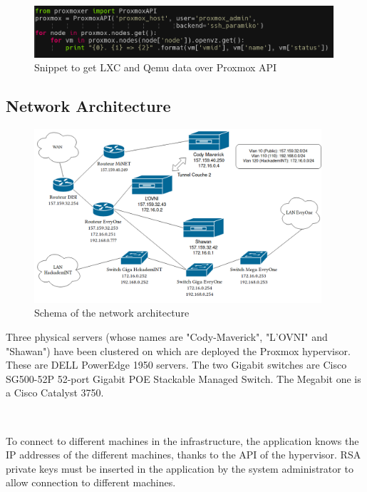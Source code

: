 \begin{figure}[!h]
  \centering
  \includegraphics[width=0.99\textwidth]{images/proxmoxer.png}
  \caption{Snippet to get LXC and Qemu data over Proxmox API}
  \label{Proxmoxer}
\end{figure}

\pagebreak

\subsection{Network Architecture}

\vspace{2cm}

\begin{figure}[!h]
  \centering
  \includegraphics[width=0.95\textwidth]{images/reseau.png}
  \caption{Schema of the network architecture}
  \label{Proxmoxer}
\end{figure}

Three physical servers (whose names are "Cody-Maverick", "L'OVNI" and "Shawan") have been clustered on which are deployed the Proxmox hypervisor. These are DELL PowerEdge 1950 servers. The two Gigabit switches are Cisco SG500-52P 52-port Gigabit POE Stackable Managed Switch. The Megabit one is a Cisco Catalyst 3750.

\\
\vspace{1cm}

To connect to different machines in the infrastructure, the application
knows the IP addresses of the different machines, thanks to the API of
the hypervisor. RSA private keys must be inserted in the application by the system administrator to allow connection to
different machines.

